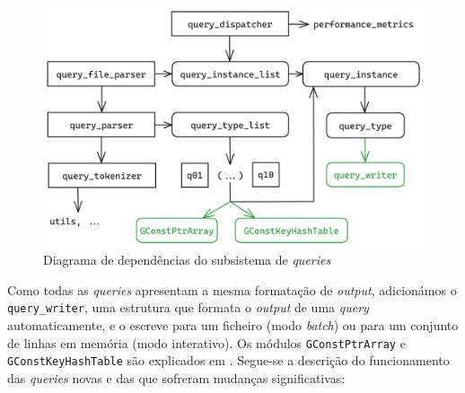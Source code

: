 \documentclass[11pt, a4paper]{article}
\begin{document}
\begin{figure}[ht]
    \centering
    \includegraphics[scale=0.15]{res-fase2/queries.png}
    \caption{Diagrama de dependências do subsistema de \emph{queries}}
    \label{fig:queries}
\end{figure}

Como todas as \emph{queries} apresentam a mesma formatação de \emph{output}, adicionámos o
\texttt{query\_writer}, uma estrutura que formata o \emph{output} de uma \emph{query}
automaticamente, e o escreve para um ficheiro (modo \emph{batch}) ou para um conjunto de linhas em
memória (modo interativo). Os módulos \texttt{GConstPtrArray} e \texttt{GConstKeyHashTable} são
explicados em . Segue-se a descrição do funcionamento das
\emph{queries} novas e das que sofreram mudanças significativas:
\end{document}
